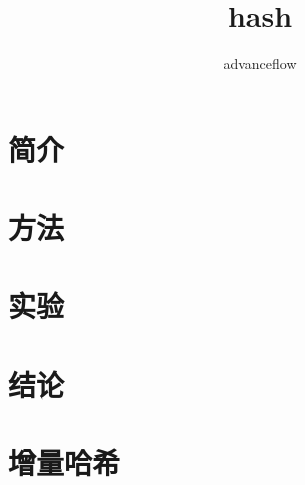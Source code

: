 \documentclass[lang=cn,a4paper,newtx]{elegantpaper}
\title{hash}
\author{advanceflow}
\begin{document}
\maketitle

\begin{abstract}

\end{abstract}

\section{简介}

\section{方法}


\section{实验}

\section{结论}

\section{增量哈希}



\nocite{*}
\printbibliography[heading=bibintoc, title=\ebibname]

\appendix
\addappheadtotoc
\end{document}
